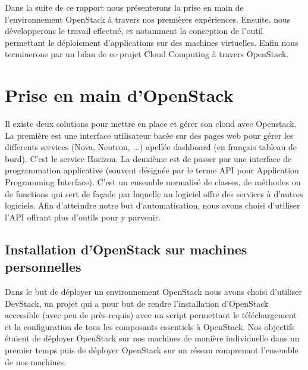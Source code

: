 \documentclass{report}
\begin{document}
        \bigbreak

        Dans la suite de ce rapport nous présenterons la prise en main de l'environnement OpenStack à travers nos premières expériences. Ensuite, nous développerons le travail effectué, et notamment la conception de l'outil permettant le déploiement d'applications sur des machines virtuelles. Enfin nous terminerons par un bilan de ce projet Cloud Computing à travers OpenStack.


\newpage
\chapter{Prise en main d'OpenStack}
       Il existe deux solutions pour mettre en place et gérer son cloud avec Openstack. La première est une interface utilisateur basée sur des pages web pour gérer les differents services (Nova, Neutron, ...) apellée dashboard (en français tableau de bord). C'est le service Horizon. La deuxième est de passer par une interface de programmation applicative (souvent désignée par le terme API pour Application Programming Interface). C'est un ensemble normalisé de classes, de méthodes ou de fonctions qui sert de façade par laquelle un logiciel offre des services à d'autres logiciels. Afin d'atteindre notre but d'automatisation, nous avons choisi d'utiliser l'API  offrant plus d'outils pour y parvenir.\bigbreak



    \section{Installation d'OpenStack sur machines personnelles}

    Dans le but de déployer un environnement OpenStack nous avons choisi d'utiliser DevStack, un projet qui a pour but de rendre l'installation d'OpenStack accessible (avec peu de près-requis) avec un script permettant le téléchargement et la configuration de tous les composants essentiels à OpenStack.\newline
    Nos objectifs étaient de déployer OpenStack sur nos machines de manière individuelle dans un premier temps puis de déployer OpenStack sur un réseau comprenant l'ensemble de nos machines.
\end{document}
